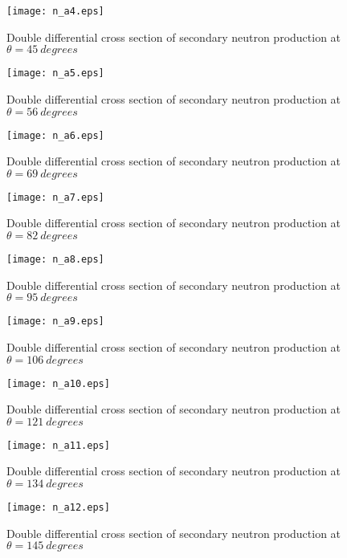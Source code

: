 \documentclass[12pt]{article}
\begin{document}
\begin{figure}[htbp]
\caption{Double differential cross section of secondary neutron production at $\theta = 45~degrees$}
\label{figa4}
\centerline{\texttt{[image: n\_a4.eps]}}
\end{figure}

\begin{figure}[htbp]
\caption{Double differential cross section of secondary neutron production at $\theta = 56~degrees$}
\label{figa5}
\centerline{\texttt{[image: n\_a5.eps]}}
\end{figure}

\begin{figure}[htbp]
\caption{Double differential cross section of secondary neutron production at $\theta = 69~degrees$}
\label{figa6}
\centerline{\texttt{[image: n\_a6.eps]}}
\end{figure}

\begin{figure}[htbp]
\caption{Double differential cross section of secondary neutron production at $\theta = 82~degrees$}
\label{figa7}
\centerline{\texttt{[image: n\_a7.eps]}}
\end{figure}

\begin{figure}[htbp]
\caption{Double differential cross section of secondary neutron production at $\theta = 95~degrees$}
\label{figa8}
\centerline{\texttt{[image: n\_a8.eps]}}
\end{figure}

\clearpage

\begin{figure}[htbp]
\caption{Double differential cross section of secondary neutron production at $\theta = 106~degrees$}
\label{figa9}
\centerline{\texttt{[image: n\_a9.eps]}}
\end{figure}

\begin{figure}[htbp]
\caption{Double differential cross section of secondary neutron production at $\theta = 121~degrees$}
\label{figa10}
\centerline{\texttt{[image: n\_a10.eps]}}
\end{figure}

\begin{figure}[htbp]
\caption{Double differential cross section of secondary neutron production at $\theta = 134~degrees$}
\label{figa11}
\centerline{\texttt{[image: n\_a11.eps]}}
\end{figure}

\begin{figure}[htbp]
\caption{Double differential cross section of secondary neutron production at $\theta = 145~degrees$}
\label{figa12}
\centerline{\texttt{[image: n\_a12.eps]}}
\end{figure}
\end{document}
